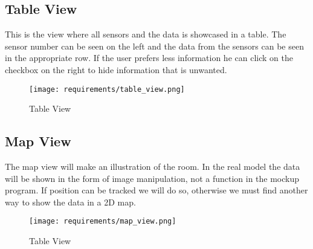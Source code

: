 \documentclass[../document]{subfiles}
\begin{document}
\subsection{Table View}
This is the view where all sensors and the data is showcased in a table. The sensor number can be seen on the left and the data from the sensors can be seen in the appropriate row. If the user prefers less information he can click on the checkbox on the right to hide information that is unwanted.

\begin{figure}[H]
\centering
\texttt{[image: requirements/table\_view.png]}
\caption{Table View}
\end{figure}

\subsection{Map View}
The map view will make an illustration of the room. In the real model the data will be shown in the form of image manipulation, not a function in the mockup program. If position can be tracked we will do so, otherwise we must find another way to show the data in a 2D map.

\begin{figure}[H]
\centering
\texttt{[image: requirements/map\_view.png]}
\caption{Table View}
\end{figure}
\end{document}
